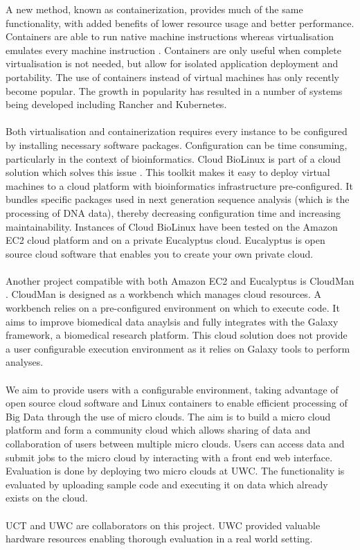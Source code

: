 \documentclass{sig-alternate-05-2015}
\begin{document}
A new method, known as containerization, provides much of the same functionality, with added benefits of lower resource usage and better performance. Containers are able to run native machine instructions whereas virtualisation emulates every machine instruction \cite{dua2014virtualization}. Containers are only useful when complete virtualisation is not needed, but allow for isolated application deployment and portability. The use of containers instead of virtual machines has only recently become popular. The growth in popularity has resulted in a number of systems being developed including Rancher and Kubernetes. 
\\\\
Both virtualisation and containerization requires every instance to be configured by installing necessary software packages. Configuration can be time consuming, particularly in the context of bioinformatics. Cloud BioLinux is part of a cloud solution which solves this issue \cite{krampis2012cloud}. This toolkit makes it easy to deploy virtual machines to a cloud platform with bioinformatics infrastructure pre-configured. It bundles specific packages used in next generation sequence analysis (which is the processing of DNA data), thereby decreasing configuration time and increasing maintainability. Instances of Cloud BioLinux have been tested on the Amazon EC2 cloud platform and on a private Eucalyptus cloud. Eucalyptus is open source cloud software that enables you to create your own private cloud.
\\\\
Another project compatible with both Amazon EC2 and Eucalyptus is CloudMan \cite{afgan2015building}. CloudMan is designed as a workbench which manages cloud resources. A workbench relies on a pre-configured environment on which to execute code. It aims to improve biomedical data anaylsis and fully integrates with the Galaxy framework, a biomedical research platform. This cloud solution does not provide a user configurable execution environment as it relies on Galaxy tools to perform analyses. 
\\\\
We aim to provide users with a configurable environment, taking advantage of open source cloud software and Linux containers to enable efficient processing of Big Data through the use of micro clouds. The aim is to build a micro cloud platform and form a community cloud which allows sharing of data and collaboration of users between multiple micro clouds. Users can access data and submit jobs to the micro cloud by interacting with a front end web interface. Evaluation is done by deploying two micro clouds at UWC. The functionality is evaluated by uploading sample code and executing it on data which already exists on the cloud.
\\\\
UCT and UWC are collaborators on this project. UWC provided valuable hardware resources enabling thorough evaluation in a real world setting.
\end{document}
